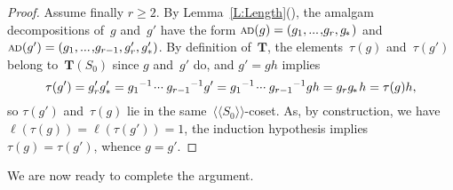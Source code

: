 \documentclass{amsart}
\numberwithin{equation}{section}
\theoremstyle{plain}
\theoremstyle{definition}
\let\ge=\geqslant
\newcounter{ITEM}
\begin{document}
\begin{proof}
Assume finally ${r} \ge 2$. By Lemma~\ref{L:Length}{\setcounter{ITEM}{3}\leavevmode\hbox{\rm()}}, the amalgam decompositions of~${g}$ and~${g}'$ have the form ${{\scriptstyle\mathrm{A\hspace{-0.1ex}D}}({g})} = ({g}_1 {, ...\hspace{0.2ex},} {g}_{r}, {{g}_{\hspace{-0.2ex}*\hspace{0.2ex}}})$ and ${{\scriptstyle\mathrm{A\hspace{-0.1ex}D}}({{g}'})} = ({g}_1 {, ...\hspace{0.2ex},} {g}_{{r}-1}, {g}'_{r}, {g}'_*)$. By definition of~${\boldsymbol{T}}$, the elements~${\tau({g})}$ and~${\tau({{g}'})}$ belong to~${\boldsymbol{T}}({S}_0)$ since ${g}$ and~${g}'$ do, and ${g}' = {g} {h}$ implies
$${\tau({{g}'})} = {g}'_{r} {g}'_* = {g}_1{^{-1}} {\hspace{0.2ex}{\cdot}{\cdot}{\cdot}\hspace{0.5ex}} {g}_{{r}-1}{^{-1}} {g}' = {g}_1{^{-1}} {\hspace{0.2ex}{\cdot}{\cdot}{\cdot}\hspace{0.5ex}} {g}_{{r}-1}{^{-1}} {g} {h} = {g}_{r} {{g}_{\hspace{-0.2ex}*\hspace{0.2ex}}} {h} = {\tau({g})} {h},$$
so ${\tau({{g}'})}$ and~${\tau({g})}$ lie in the same~${\langle\!\langle{{{S}_0}}\rangle\!\rangle}$-coset. As, by construction, we have ${\ell({{\tau({g})}})} = {\ell({{\tau({{g}'})}})} = 1$, the induction hypothesis implies ${\tau({g})} = {\tau({{g}'})}$, whence ${g} = {g}'$.
\end{proof}
 
We are now ready to complete the argument.
\end{document}
